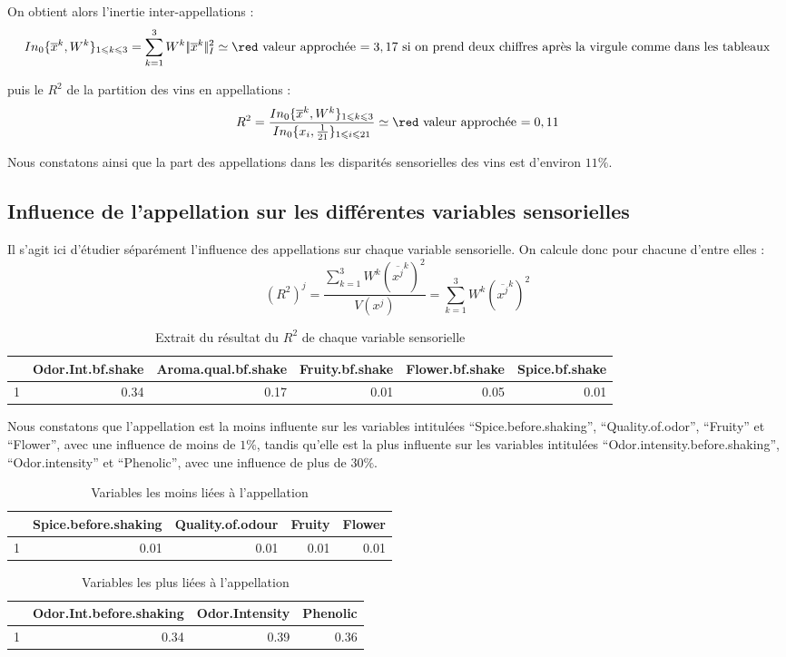 \documentclass[a4paper,10pt]{article}
\newcommand{\dsum}[2]{\displaystyle\sum_{#1}^{#2}}
\begin{document}
On obtient alors l'inertie inter-appellations : 
$$In_{0}\{\overline x^k,W^k\}_{1\leqslant k\leqslant 3}=\dsum{k=1}3W^k|\!|\overline x^k|\!|_I^2\simeq \text{\red valeur approchée $= 3,17$ si on prend deux chiffres après la virgule comme dans les tableaux}$$

puis le $R^2$ de la partition des vins en appellations : 
$$R^2=\dfrac{In_{0}\{\overline x^k,W^k\}_{1\leqslant k\leqslant 3}}{In_0\{x_i,\frac 1{21}\}_{1\leqslant i\leqslant 21}}\simeq \text{\red valeur approchée $= 0,11$}$$

Nous constatons ainsi que la part des appellations dans les disparités sensorielles des vins est d'environ $11\%$.

\subsection{Influence de l'appellation sur les différentes variables sensorielles}

Il s'agit ici d'étudier séparément l'influence des appellations sur chaque variable sensorielle. On calcule donc pour chacune d'entre elles :
$$(R^2)^j=\dfrac{\dsum{k=1}3W^k(\overline{x^j}^k)^2}{V(x^j)}=\dsum{k=1}3W^k(\overline{x^j}^k)^2$$

\begin{table}[ht]
	\centering
	\begin{tabular}{rrrrrr}
		\hline
		& Odor.Int.bf.shake & Aroma.qual.bf.shake & Fruity.bf.shake & Flower.bf.shake & Spice.bf.shake \\ 
		\hline
		1 & 0.34 & 0.17 & 0.01 & 0.05 & 0.01 \\ 
		\hline
	\end{tabular}
	\caption{Extrait du résultat du $R^2$ de chaque variable sensorielle} 
\end{table}

Nous constatons que l'appellation est la moins influente sur les variables intitulées ``Spice.before.shaking'', ``Quality.of.odor'', ``Fruity'' et ``Flower'', avec une influence de moins de $1\%$, tandis qu'elle est la plus influente sur les variables intitulées ``Odor.intensity.before.shaking'', ``Odor.intensity'' et ``Phenolic'', avec une influence de plus de $30\%$. \\
\begin{table}[ht]
	\centering
	\begin{tabular}{rrrrr}
		\hline
		& Spice.before.shaking & Quality.of.odour & Fruity & Flower \\ 
		\hline
		1 & 0.01 & 0.01 & 0.01 & 0.01 \\ 
		\hline
	\end{tabular}
	\caption{Variables les moins liées à l'appellation} 
\end{table}
\begin{table}[ht]
	\centering
	\begin{tabular}{rrrr}
		\hline
		& Odor.Int.before.shaking & Odor.Intensity & Phenolic \\ 
		\hline
		1 & 0.34 & 0.39 & 0.36 \\ 
		\hline
	\end{tabular}
	\caption{Variables les plus liées à l'appellation} 
\end{table}
\end{document}
